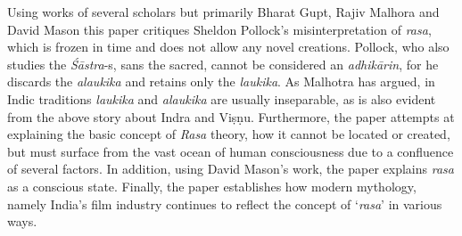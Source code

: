 Using works of several scholars but primarily Bharat Gupt, Rajiv Malhora and David Mason this paper critiques Sheldon Pollock’s misinterpretation of \textsl{rasa}, which is frozen in time and does not allow any novel creations. Pollock, who also studies the \textsl{Śāstra}-s, sans the sacred, cannot be considered an \textsl{adhikārin}, for he discards the \textsl{alaukika} and retains only the \textsl{laukika}. As Malhotra has argued, in Indic traditions \textsl{laukika} and \textsl{alaukika} are usually inseparable, as is also evident from the above story about Indra and Viṣṇu. Furthermore, the paper attempts at explaining the basic concept of \textsl{Rasa} theory, how it cannot be located or created, but must surface from the vast ocean of human consciousness due to a confluence of several factors. In addition, using David Mason’s work, the paper explains \textsl{rasa} as a conscious state. Finally, the paper establishes how modern mythology, namely India’s film industry continues to reflect the concept of ‘\textsl{rasa}' in various ways. 

